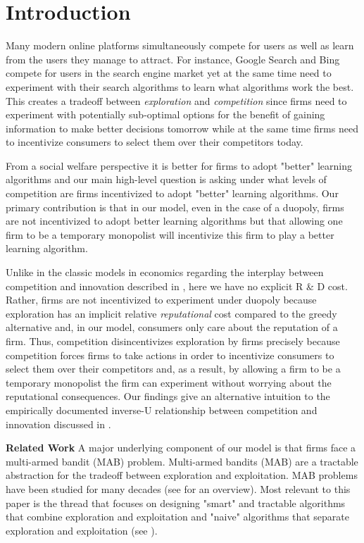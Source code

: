 \documentclass{article}
\theoremstyle{definition}
\begin{document}
\section{Introduction}\label{section:1}

Many modern online platforms simultaneously compete for users as well as learn from the users they manage to attract. For instance, Google Search and Bing compete for users in the search engine market yet at the same time need to experiment with their search algorithms to learn what algorithms work the best. This creates a tradeoff between \textit{exploration} and \textit{competition} since firms need to experiment with potentially sub-optimal options for the benefit of gaining information to make better decisions tomorrow while at the same time firms need to incentivize consumers to select them over their competitors today.

From a social welfare perspective it is better for firms to adopt "better" learning algorithms and our main high-level question is asking under what levels of competition are firms incentivized to adopt "better" learning algorithms. Our primary contribution is that in our model, even in the case of a duopoly, firms are not incentivized to adopt better learning algorithms but that allowing one firm to be a temporary monopolist will incentivize this firm to play a better learning algorithm. 

Unlike in the classic models in economics regarding the interplay between competition and innovation described in \citet{barro2004economic}, here we have no explicit R \& D cost. Rather, firms are not incentivized to experiment under duopoly because exploration has an implicit relative \textit{reputational} cost compared to the greedy alternative and, in our model, consumers only care about the reputation of a firm. Thus, competition disincentivizes exploration by firms precisely because competition forces firms to take actions in order to incentivize consumers to select them over their competitors and, as a result, by allowing a firm to be a temporary monopolist the firm can experiment without worrying about the reputational consequences. Our findings give an alternative intuition to the empirically documented inverse-U relationship between competition and innovation discussed in \citet{aghion2005competition}.

\textbf{Related Work} A major underlying component of our model is that firms face a multi-armed bandit (MAB) problem. Multi-armed bandits (MAB) are a tractable abstraction for the tradeoff between exploration and exploitation. MAB problems have been studied for many decades (see \citet{bubeck2012regret} for an overview). Most relevant to this paper is the thread that focuses on designing "smart" and tractable algorithms that combine exploration and exploitation and "naive" algorithms that separate exploration and exploitation (see \citet{slivkins2017bandits}).
\end{document}
